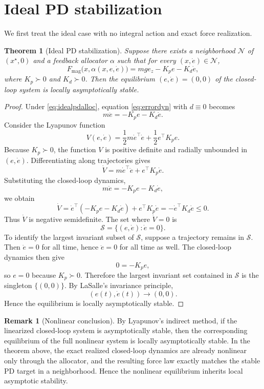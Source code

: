 \documentclass[11pt]{article}
\newtheorem{theorem}{Theorem}
\theoremstyle{definition}
\newtheorem{remark}{Remark}
\begin{document}
\section{Ideal PD stabilization}

We first treat the ideal case with no integral action and exact force realization.

\begin{theorem}[Ideal PD stabilization]
Suppose there exists a neighborhood $\mathcal N$ of $(x^\star,0)$ and a feedback allocator $\alpha$ such that for every $(x,\dot e) \in \mathcal N$,
\begin{equation}
F_{\mathrm{mag}}\bigl(x,\alpha(x,e,\dot e)\bigr) = mg e_z - K_p e - K_d \dot e,
\label{eq:idealpdalloc}
\end{equation}
where $K_p \succ 0$ and $K_d \succ 0$. Then the equilibrium $(e,\dot e) = (0,0)$ of the closed-loop system is locally asymptotically stable.
\end{theorem}

\begin{proof}
Under \eqref{eq:idealpdalloc}, equation \eqref{eq:errordyn} with $d \equiv 0$ becomes
\[
 m\ddot e = -K_p e - K_d \dot e.
\]
Consider the Lyapunov function
\[
V(e,\dot e) = \frac12 m\dot e^\top \dot e + \frac12 e^\top K_p e.
\]
Because $K_p \succ 0$, the function $V$ is positive definite and radially unbounded in $(e,\dot e)$. Differentiating along trajectories gives
\[
\dot V = m\dot e^\top \ddot e + e^\top K_p \dot e.
\]
Substituting the closed-loop dynamics,
\[
 m\ddot e = -K_p e - K_d \dot e,
\]
we obtain
\[
\dot V = \dot e^\top(-K_p e - K_d\dot e) + e^\top K_p \dot e = -\dot e^\top K_d \dot e \le 0.
\]
Thus $\dot V$ is negative semidefinite. The set where $\dot V = 0$ is
\[
\mathcal S = \{(e,\dot e): \dot e = 0\}.
\]
To identify the largest invariant subset of $\mathcal S$, suppose a trajectory remains in $\mathcal S$. Then $\dot e = 0$ for all time, hence $\ddot e = 0$ for all time as well. The closed-loop dynamics then give
\[
0 = -K_p e,
\]
so $e=0$ because $K_p \succ 0$. Therefore the largest invariant set contained in $\mathcal S$ is the singleton $\{(0,0)\}$. By LaSalle's invariance principle,
\[
(e(t),\dot e(t)) \to (0,0).
\]
Hence the equilibrium is locally asymptotically stable.
\end{proof}

\begin{remark}[Nonlinear conclusion]
By Lyapunov's indirect method, if the linearized closed-loop system is asymptotically stable, then the corresponding equilibrium of the full nonlinear system is locally asymptotically stable. In the theorem above, the exact realized closed-loop dynamics are already nonlinear only through the allocator, and the resulting force law exactly matches the stable PD target in a neighborhood. Hence the nonlinear equilibrium inherits local asymptotic stability.
\end{remark}
\end{document}

